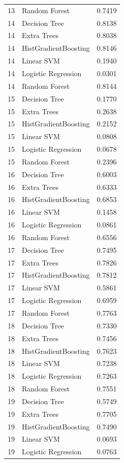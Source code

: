 \begin{tabular}{lll}
13 & Random Forest & 0.7419 \\
14 & Decision Tree & 0.8138 \\
14 & Extra Trees & 0.8038 \\
14 & HistGradientBoosting & 0.8146 \\
14 & Linear SVM & 0.1940 \\
14 & Logistic Regression & 0.0301 \\
14 & Random Forest & 0.8144 \\
15 & Decision Tree & 0.1770 \\
15 & Extra Trees & 0.2638 \\
15 & HistGradientBoosting & 0.2152 \\
15 & Linear SVM & 0.0808 \\
15 & Logistic Regression & 0.0678 \\
15 & Random Forest & 0.2396 \\
16 & Decision Tree & 0.6003 \\
16 & Extra Trees & 0.6333 \\
16 & HistGradientBoosting & 0.6853 \\
16 & Linear SVM & 0.1458 \\
16 & Logistic Regression & 0.0861 \\
16 & Random Forest & 0.6556 \\
17 & Decision Tree & 0.7495 \\
17 & Extra Trees & 0.7826 \\
17 & HistGradientBoosting & 0.7812 \\
17 & Linear SVM & 0.5861 \\
17 & Logistic Regression & 0.6959 \\
17 & Random Forest & 0.7763 \\
18 & Decision Tree & 0.7330 \\
18 & Extra Trees & 0.7456 \\
18 & HistGradientBoosting & 0.7623 \\
18 & Linear SVM & 0.7238 \\
18 & Logistic Regression & 0.7263 \\
18 & Random Forest & 0.7551 \\
19 & Decision Tree & 0.5749 \\
19 & Extra Trees & 0.7705 \\
19 & HistGradientBoosting & 0.7490 \\
19 & Linear SVM & 0.0693 \\
19 & Logistic Regression & 0.0763 \\

\end{tabular}
